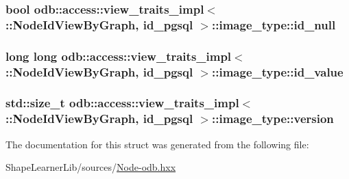 \subsubsection[{id\+\_\+null}]{\setlength{\rightskip}{0pt plus 5cm}bool odb\+::access\+::view\+\_\+traits\+\_\+impl$<$ \+::{\bf Node\+Id\+View\+By\+Graph}, id\+\_\+pgsql $>$\+::image\+\_\+type\+::id\+\_\+null}\label{structodb_1_1access_1_1view__traits__impl_3_01_1_1_node_id_view_by_graph_00_01id__pgsql_01_4_1_1image__type_a908a69b5f62c62425c9ae468e9fc1707}
\hypertarget{structodb_1_1access_1_1view__traits__impl_3_01_1_1_node_id_view_by_graph_00_01id__pgsql_01_4_1_1image__type_ad1f0b261aa9fc3e6d395050313e89df4}{}
\subsubsection[{id\+\_\+value}]{\setlength{\rightskip}{0pt plus 5cm}long long odb\+::access\+::view\+\_\+traits\+\_\+impl$<$ \+::{\bf Node\+Id\+View\+By\+Graph}, id\+\_\+pgsql $>$\+::image\+\_\+type\+::id\+\_\+value}\label{structodb_1_1access_1_1view__traits__impl_3_01_1_1_node_id_view_by_graph_00_01id__pgsql_01_4_1_1image__type_ad1f0b261aa9fc3e6d395050313e89df4}
\hypertarget{structodb_1_1access_1_1view__traits__impl_3_01_1_1_node_id_view_by_graph_00_01id__pgsql_01_4_1_1image__type_afa27e8f02e6d69738e02c54d17a2c3f8}{}
\subsubsection[{version}]{\setlength{\rightskip}{0pt plus 5cm}std\+::size\+\_\+t odb\+::access\+::view\+\_\+traits\+\_\+impl$<$ \+::{\bf Node\+Id\+View\+By\+Graph}, id\+\_\+pgsql $>$\+::image\+\_\+type\+::version}\label{structodb_1_1access_1_1view__traits__impl_3_01_1_1_node_id_view_by_graph_00_01id__pgsql_01_4_1_1image__type_afa27e8f02e6d69738e02c54d17a2c3f8}


The documentation for this struct was generated from the following file\+:\begin{DoxyCompactItemize}
\item 
Shape\+Learner\+Lib/sources/\hyperlink{_node-odb_8hxx}{Node-\/odb.\+hxx}\end{DoxyCompactItemize}
